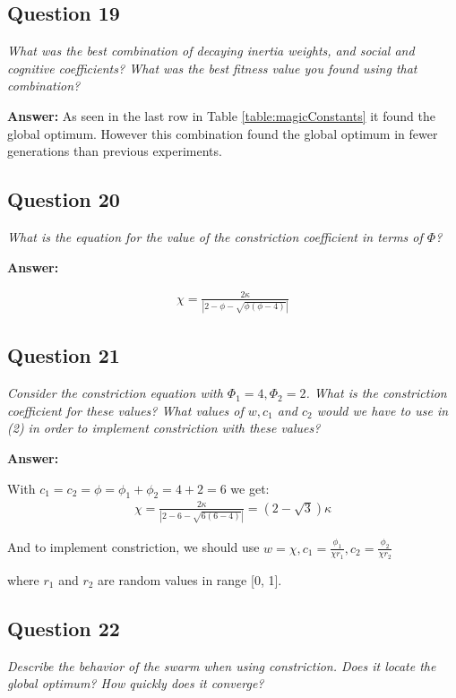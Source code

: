 \documentclass[a4paper]{article}
\begin{document}
\subsection*{Question 19}
\emph{What was the best combination of decaying inertia weights, and social and cognitive coefficients? What was the best fitness value you found using that combination?}

\textbf{Answer:} As seen in the last row in Table \ref{table:magicConstants} it found the global optimum. However this combination found the global optimum in fewer generations than previous experiments. 

\subsection*{Question 20}
\emph{What is the equation for the value of the constriction coefficient
in terms of $\Phi$?}

\textbf{Answer:}

\begin{align*}
\chi = \frac{2\kappa}{|2-\phi-\sqrt{\phi(\phi-4)}|}
\end{align*}


\subsection*{Question 21}
\emph{Consider the constriction equation with $\Phi_1 = 4, \Phi_2 = 2$. What is the constriction coefficient for these values? What values of $w, c_1$ and $c_2$ would we have to use in (2) in order to implement constriction with these values?}

\textbf{Answer:}

With $c_1 = c_2 = \phi = \phi_1 + \phi_2 = 4 + 2 = 6$ we get:
\begin{align*}
\chi = \frac{2\kappa}{|2-6-\sqrt{6(6-4)}|} = (2-\sqrt{3})\kappa
\end{align*}

And to implement constriction, we should use $w = \chi, c_1 =
\frac{\phi_1}{\chi r_1}, c_2 = \frac{\phi_2}{\chi r_2}$

where $r_1$ and $r_2$ are random values in range [0, 1].
\subsection*{Question 22}
\emph{Describe the behavior of the swarm when using constriction.
Does it locate the global optimum? How quickly does it converge?}
\end{document}
